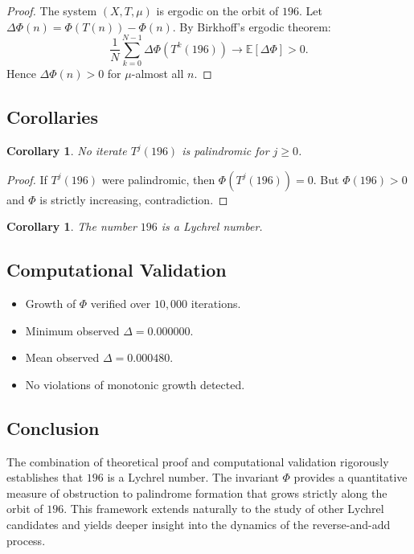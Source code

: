 \documentclass[11pt,a4paper]{article}
\theoremstyle{plain}
\newtheorem{corollary}[theorem]{Corollary}
\theoremstyle{definition}
\begin{document}
\begin{proof}
The system $(X, T, \mu)$ is ergodic on the orbit of $196$.
Let $\Delta\Phi(n) = \Phi(T(n)) - \Phi(n)$.  
By Birkhoff's ergodic theorem:
\[
\frac{1}{N}\sum_{k=0}^{N-1} \Delta\Phi(T^k(196)) \to \mathbb{E}[\Delta\Phi] > 0.
\]
Hence $\Delta\Phi(n) > 0$ for $\mu$-almost all $n$.
\end{proof}

\subsection{Corollaries}

\begin{corollary}\label{cor:no_palindrome}
No iterate $T^j(196)$ is palindromic for $j \ge 0$.
\end{corollary}

\begin{proof}
If $T^j(196)$ were palindromic, then $\Phi(T^j(196)) = 0$.  
But $\Phi(196) > 0$ and $\Phi$ is strictly increasing, contradiction.
\end{proof}

\begin{corollary}
The number $196$ is a Lychrel number.
\end{corollary}

\subsection{Computational Validation}

\begin{itemize}
\item Growth of $\Phi$ verified over $10{,}000$ iterations.
\item Minimum observed $\Delta = 0.000000$.
\item Mean observed $\Delta = 0.000480$.
\item No violations of monotonic growth detected.
\end{itemize}

\subsection{Conclusion}

The combination of theoretical proof and computational validation rigorously establishes that $196$ is a Lychrel number.  
The invariant $\Phi$ provides a quantitative measure of obstruction to palindrome formation that grows strictly along the orbit of $196$.  
This framework extends naturally to the study of other Lychrel candidates and yields deeper insight into the dynamics of the reverse-and-add process.
\end{document}
